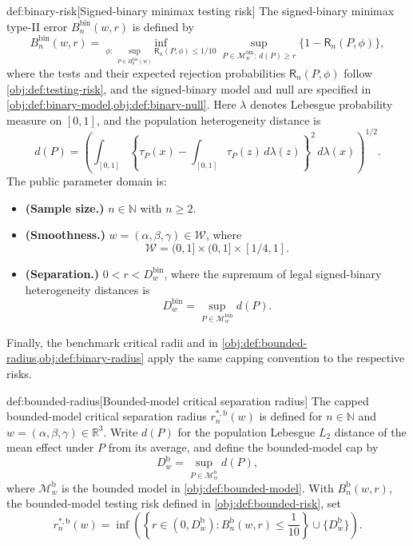 \begin{definitionv}{def:binary-risk}[Signed-binary minimax testing risk]
The signed-binary minimax type-II error \(B_n^{\mathrm{bin}}(w,r)\) is defined by
\[
B_n^{\mathrm{bin}}(w,r)
=
\inf_{\phi:\,\sup_{P\in H_0^{\mathrm{bin}}(w)}
\mathsf R_n(P,\phi)\le 1/10}
\sup_{P\in\mathcal M^{\mathrm{bin}}_w:\,d(P)\ge r}
\{1-\mathsf R_n(P,\phi)\},
\]
where the tests and their expected rejection probabilities \(\mathsf R_n(P,\phi)\) follow \cref{obj:def:testing-risk}, and the signed-binary model and null are specified in \cref{obj:def:binary-model,obj:def:binary-null}. Here \(\lambda\) denotes Lebesgue probability measure on \([0,1]\), and the population heterogeneity distance is
\[
d(P)
=
\left(
\int_{[0,1]}
\left\{\tau_P(x)-\int_{[0,1]}\tau_P(z)\,d\lambda(z)\right\}^{2}
\,d\lambda(x)
\right)^{1/2}.
\]
The public parameter domain is:
\begin{itemize}
\item \textbf{(Sample size.)} \(n\in\mathbb N\) with \(n\ge2\).
\item \textbf{(Smoothness.)} \(w=(\alpha,\beta,\gamma)\in\mathcal W\), where
\[
\mathcal W=(0,1]\times(0,1]\times[1/4,1].
\]
\item \textbf{(Separation.)} \(0<r<D_w^{\mathrm{bin}}\), where the supremum of legal signed-binary heterogeneity distances is
\[
D_w^{\mathrm{bin}}
=
\sup_{P\in\mathcal M^{\mathrm{bin}}_w}d(P).
\]
\end{itemize}
\end{definitionv}

Finally, the benchmark critical radii  and  in \cref{obj:def:bounded-radius,obj:def:binary-radius} apply the same capping convention to the respective risks.

\begin{definitionv}{def:bounded-radius}[Bounded-model critical separation radius]
The capped bounded-model critical separation radius \(r_n^{*,\mathrm b}(w)\) is defined for \(n\in\mathbb N\) and \(w=(\alpha,\beta,\gamma)\in\mathbb R^3\). Write \(d(P)\) for the population Lebesgue \(L_2\) distance of the mean effect under \(P\) from its average, and define the bounded-model cap by
\[
D_w^{\mathrm b}
=
\sup_{P\in\mathcal M^{\mathrm b}_w} d(P),
\]
where \(\mathcal M^{\mathrm b}_w\) is the bounded model in \cref{obj:def:bounded-model}. With \(B_n^{\mathrm b}(w,r)\), the bounded-model testing risk defined in \cref{obj:def:bounded-risk}, set
\[
r_n^{*,\mathrm b}(w)
=
\inf\left(
\left\{r\in(0,D_w^{\mathrm b}):B_n^{\mathrm b}(w,r)\le \frac{1}{10}\right\}
\cup\{D_w^{\mathrm b}\}
\right).
\]
\end{definitionv}

